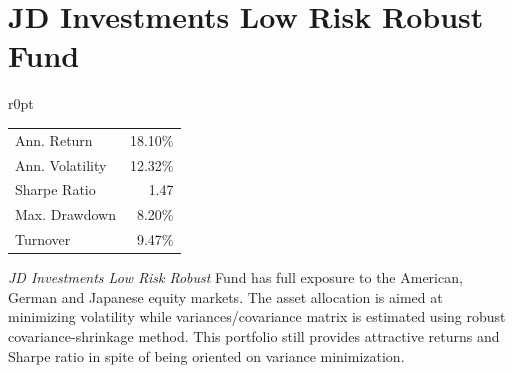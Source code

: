\documentclass[11pt, parskip=full, DIV=14, headings=small, footsepline, footinclude=false, headsepline]{scrreprt}
\let\oldcenter\center
\let\oldendcenter\endcenter
\renewenvironment{center}{\setlength\topsep{6pt}\oldcenter}{\oldendcenter}
\begin{document}
\newpage\section{JD Investments Low Risk Robust Fund}
\begin{mywraptable}{r}{0pt}
  \begin{tabular}{lr}
  \toprule
  Ann. Return & 18.10\%\\
  Ann. Volatility & 12.32\%\\
  Sharpe Ratio & 1.47\\
  Max. Drawdown& 8.20\%\\
  Turnover & 9.47\%\\
  \bottomrule
  \end{tabular}
\end{mywraptable}
\textit{JD Investments Low Risk Robust} Fund has full exposure to the American, German and Japanese equity markets.
The asset allocation is aimed at minimizing volatility while variances/covariance matrix is estimated using robust covariance-shrinkage method.
This portfolio still provides attractive returns and Sharpe ratio in spite of being oriented on variance minimization.

\begin{center}
\end{center}
\end{document}
